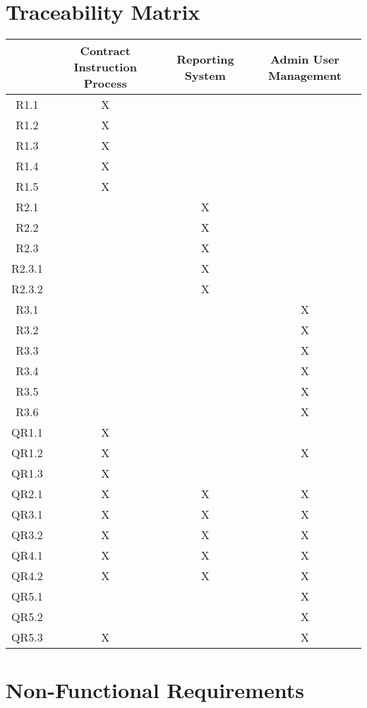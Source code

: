 \documentclass[11pt]{article}
\begin{document}
 \newpage
\section{Traceability Matrix}
\begin{center}
 \begin{tabular}{||c | c | c | c ||} 
 \hline
  & Contract Instruction Process & Reporting System & Admin User Management \\
 \hline\hline
 R1.1 & X &  &  \\
 \hline
 R1.2 & X &  &  \\
 \hline
 R1.3 & X &  &  \\
 \hline
 R1.4 & X &  &  \\
 \hline
 R1.5 & X &  &  \\
 \hline
 R2.1 &  & X &  \\
 \hline
 R2.2 &  & X &  \\
 \hline
 R2.3 &  & X &  \\
 \hline
 R2.3.1 &  & X &  \\
 \hline
 R2.3.2 &  & X &  \\
 \hline
 R3.1 &  &  & X \\
 \hline
 R3.2 &  &  & X \\
 \hline
 R3.3 &  &  & X \\
 \hline
 R3.4 &  &  & X \\
 \hline
 R3.5 &  &  & X \\
 \hline
 R3.6 &  &  & X \\
 \hline
 QR1.1 & X &  & \\
 \hline
 QR1.2 & X &  & X \\
 \hline
 QR1.3 & X &  & \\
 \hline
 QR2.1 & X & X & X \\
 \hline
 QR3.1 & X & X & X \\
 \hline
 QR3.2 & X & X & X \\
 \hline
 QR4.1 & X & X & X \\
 \hline
 QR4.2 & X & X & X \\
 \hline
 QR5.1 &  &  & X \\
 \hline
 QR5.2 &  &  & X \\
 \hline
 QR5.3 & X &  & X \\
 \hline

\end{tabular}
\end{center}


\section{Non-Functional Requirements}
\end{document}
